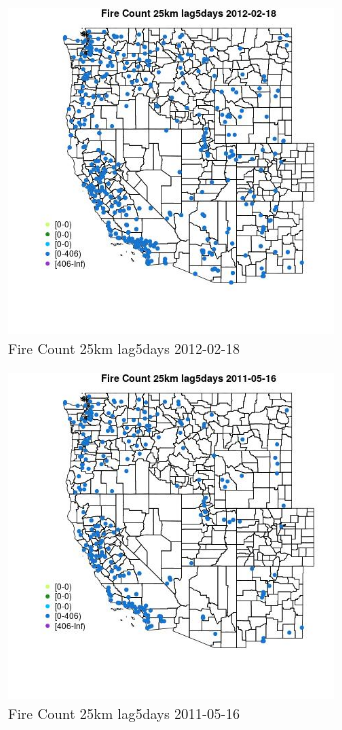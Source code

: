 \begin{figure} 
\centering  
\includegraphics[width=0.77\textwidth]{Code_Outputs/Report_ML_input_PM25_Step4_part_f_de_duplicated_aveswNAs_MapObsFire_Count_25km_lag5days2012-02-18.jpg} 
\caption{\label{fig:Report_ML_input_PM25_Step4_part_f_de_duplicated_aveswNAsMapObsFire_Count_25km_lag5days2012-02-18}Fire Count 25km lag5days 2012-02-18} 
\end{figure} 
 

\clearpage 

\begin{figure} 
\centering  
\includegraphics[width=0.77\textwidth]{Code_Outputs/Report_ML_input_PM25_Step4_part_f_de_duplicated_aveswNAs_MapObsFire_Count_25km_lag5days2011-05-16.jpg} 
\caption{\label{fig:Report_ML_input_PM25_Step4_part_f_de_duplicated_aveswNAsMapObsFire_Count_25km_lag5days2011-05-16}Fire Count 25km lag5days 2011-05-16} 
\end{figure} 
 

